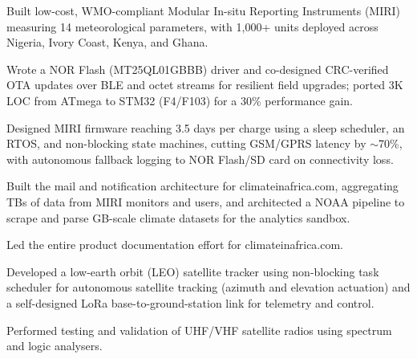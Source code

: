 
\begin{details}
    \item Built low-cost, WMO-compliant Modular In-situ Reporting Instruments (MIRI) measuring 14 meteorological parameters, with 1{,}000+ units deployed across Nigeria, Ivory Coast, Kenya, and Ghana.
    \item Wrote a NOR Flash (MT25QL01GBBB) driver and co-designed CRC-verified OTA updates over BLE and octet streams for resilient field upgrades; ported 3K LOC from ATmega to STM32 (F4/F103) for a 30\% performance gain.
    \item Designed MIRI firmware reaching 3.5 days per charge using a sleep scheduler, an RTOS, and non-blocking state machines, cutting GSM/GPRS latency by $\sim$70\%, with autonomous fallback logging to NOR Flash/SD card on connectivity loss.
   
    \item Built the mail and notification architecture for climateinafrica.com, aggregating TBs of data from MIRI monitors and users, and architected a NOAA pipeline to scrape and parse GB-scale climate datasets for the analytics sandbox.
    \item Led the entire product documentation effort for climateinafrica.com.
    \item Developed a low-earth orbit (LEO) satellite tracker using non-blocking task scheduler for autonomous satellite tracking (azimuth and elevation actuation) and a self-designed LoRa base-to-ground-station link for telemetry and control.
    \item Performed testing and validation of UHF/VHF satellite radios using spectrum and logic analysers.
\end{details}

